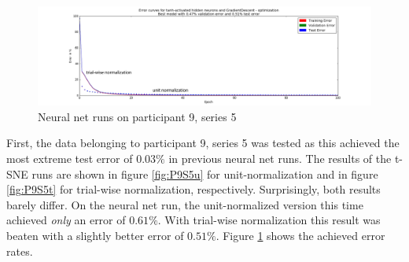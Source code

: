 \documentclass{article} %
\begin{document}
\begin{figure}[h]
	\centering
	\hspace*{-1.7cm}
	\includegraphics[width=1.25\textwidth]{P9S5_double.png}
	\caption{Neural net runs on participant 9, series 5}
	\label{fig:P9S5_double}
\end{figure}
First, the data belonging to participant 9, series 5 was tested as this achieved the most extreme test error of $0.03\%$ in previous neural net runs. The results of the t-SNE runs are shown in figure \ref{fig:P9S5u} for unit-normalization and in figure \ref{fig:P9S5t} for trial-wise normalization, respectively. Surprisingly, both results barely differ. On the neural net run, the unit-normalized version this time achieved \emph{only} an error of $0.61\%$. With trial-wise normalization this result was beaten with a slightly better error of $0.51\%$. Figure \ref{fig:P9S5_double} shows the achieved error rates.
\end{document}
